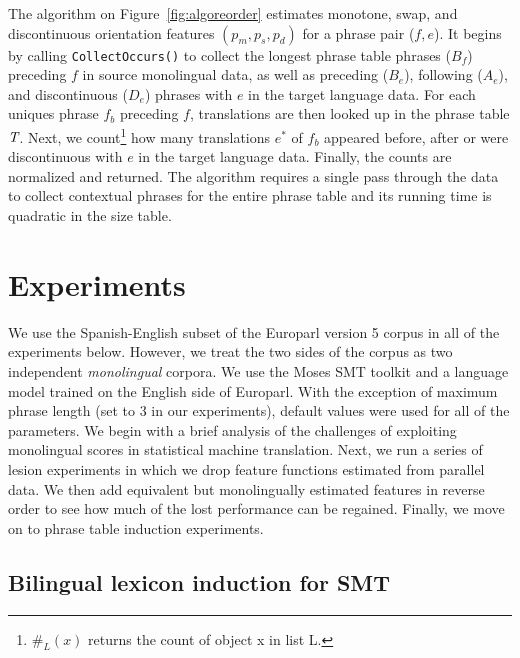 \documentclass[11pt]{article}
\newcommand{\mnote}[1]{\marginpar{%
  \vskip-\baselineskip
  \raggedright\footnotesize
  \itshape\hrule\smallskip\tiny{#1}\par\smallskip\hrule}}
\newcommand{\mtodo}[1]{\mnote{\textcolor{red}{#1}}}
\newcommand{\figref}[1]{Figure~\ref{#1}}
\begin{document}
The algorithm on \figref{fig:algoreorder} estimates monotone, swap, and discontinuous orientation features $(p_m, p_s, p_d)$ for a phrase pair ($f, e$).  It begins by calling {\tt \small CollectOccurs()} to collect the longest phrase table phrases ($B_f$) preceding $f$ in source monolingual data, as well as preceding ($B_e$), following ($A_e$), and discontinuous ($D_e$) phrases with $e$ in the target language data.  For each uniques phrase $f_{b}$ preceding $f$, translations are then looked up in the phrase table $\emph{T}$.  Next, we count\footnote{$\#_{L}(x)$ returns the count of object x in list L.} how many translations $e^*$ of $f_b$ appeared before, after or were discontinuous with $e$ in the target language data.  Finally, the counts are normalized and returned. \mtodo{Be more specific about the out-of-order counts?}  The algorithm requires a single pass through the data to collect contextual phrases for the entire phrase table and its running time is quadratic in the size table.\mtodo{Check}


\section{Experiments} \label{sect:exp}

We use the Spanish-English\mtodo{Add German if done in time.} subset of the Europarl version 5 corpus \cite{Koehn:2005} in all of the experiments below.  However, we treat the two sides of the corpus as two independent {\em monolingual} corpora.  We use the Moses SMT toolkit\mtodo{Add a moses citation} and a language model trained on the English side of Europarl.  With the exception of maximum phrase length (set to 3 in our experiments\mtodo{Add our curve?}), default values were used for all of the parameters.  We begin with a brief analysis of the challenges of exploiting monolingual scores in statistical machine translation.   Next, we run a series of lesion experiments in which we drop feature functions estimated from parallel data.  We then add equivalent but monolingually estimated features in reverse order to see how much of the lost performance can be regained.  Finally, we move on to phrase table induction experiments.

\subsection{Bilingual lexicon induction for SMT}
\end{document}
